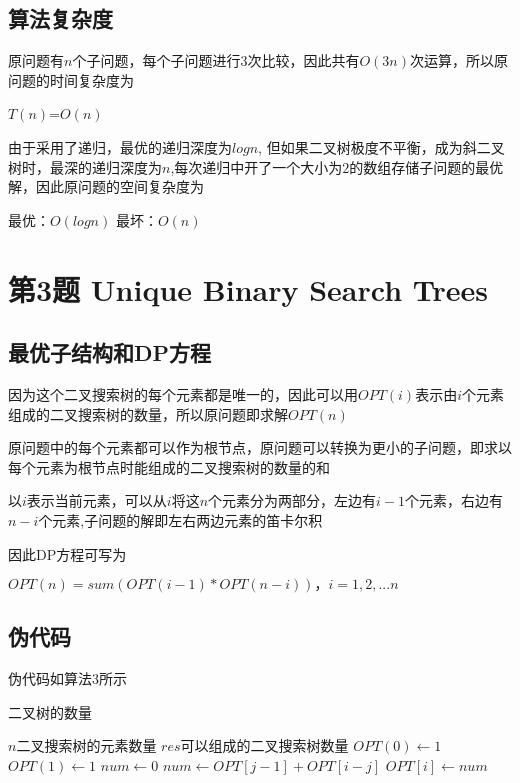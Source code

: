 \documentclass{article}
\begin{document}
\subsection{算法复杂度}
原问题有$n$个子问题，每个子问题进行$3$次比较，因此共有$O(3n)$次运算，所以原问题的时间复杂度为
\begin{center}
    $T(n)$=$O(n)$ 
\end{center} 
\par 由于采用了递归，最优的递归深度为$logn$, 但如果二叉树极度不平衡，成为斜二叉树时，最深的递归深度为$n$,每次递归中开了一个大小为$2$的数组存储子问题的最优解，因此原问题的空间复杂度为
\begin{center}
    最优：$O(logn)$
    最坏：$O(n)$
\end{center} 

\newpage
\section{第3题 Unique Binary Search Trees}
\subsection{最优子结构和DP方程}
因为这个二叉搜索树的每个元素都是唯一的，因此可以用$OPT(i)$表示由$i$个元素组成的二叉搜索树的数量，所以原问题即求解$OPT(n)$
\par 原问题中的每个元素都可以作为根节点，原问题可以转换为更小的子问题，即求以每个元素为根节点时能组成的二叉搜索树的数量的和
\par 以$i$表示当前元素，可以从$i$将这$n$个元素分为两部分，左边有$i-1$个元素，右边有$n-i$个元素,子问题的解即左右两边元素的笛卡尔积
\par 因此DP方程可写为
\begin{center}
    $OPT(n) = sum(OPT(i-1) * OPT(n-i))，i=1,2,...n$
\end{center}

\subsection{伪代码}
\par 伪代码如算法3所示

\begin{CJK*}{UTF8}{gkai}
    \begin{algorithm}
        \caption{二叉树的数量}
        \begin{algorithmic}[1] %
            \Require $n$二叉搜索树的元素数量
            \Ensure $res$可以组成的二叉搜索树数量
                \State $OPT(0) \gets 1$
                \State $OPT(1) \gets 1$
                    \State {}
                \EndIf
                    \State $num \gets 0$
                        \State $num \gets OPT[j-1] + OPT[i-j]$
                    \EndFor
                    $OPT[i] \gets num$
                \EndFor
                \State {}
            \EndFunction
        \end{algorithmic}
    \end{algorithm}
\end{CJK*}
\end{document}
